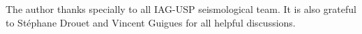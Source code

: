 \documentclass[draft, grl]{agutex}
\begin{document}
\begin{article}
\begin{acknowledgments}
The author thanks specially to 
all IAG-USP seismological team. It is also grateful to Stéphane Drouet and Vincent Guigues for all helpful discussions.
\end{acknowledgments}
















\end{article}
\end{document}
